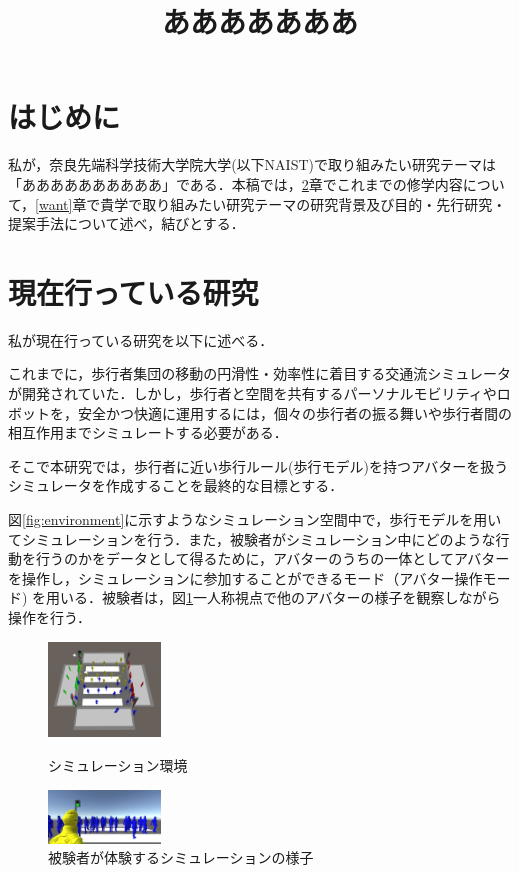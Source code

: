 \documentclass[twocolumn]{jarticle}%
\title{\vspace{5mm}\large{あああああああ}\vspace{-15mm}}
\date{}
\begin{document}
\normalsize
\maketitle

\section{はじめに}
\thispagestyle{fancy}

私が，奈良先端科学技術大学院大学(以下NAIST)で取り組みたい研究テーマは「ああああああああああ」である．本稿では，\ref{current}章でこれまでの修学内容について，\ref{want}章で貴学で取り組みたい研究テーマの研究背景及び目的・先行研究・提案手法について述べ，結びとする．

\section{現在行っている研究}\label{current}
私が現在行っている研究を以下に述べる．

これまでに，歩行者集団の移動の円滑性・効率性に着目する交通流シミュレータが開発されていた．しかし，歩行者と空間を共有するパーソナルモビリティやロボットを，安全かつ快適に運用するには，個々の歩行者の振る舞いや歩行者間の相互作用までシミュレートする必要がある．

そこで本研究では，歩行者に近い歩行ルール(歩行モデル)を持つアバターを扱うシミュレータを作成することを最終的な目標とする．

図\ref{fig:environment}に示すようなシミュレーション空間中で，歩行モデルを用いてシミュレーションを行う．また，被験者がシミュレーション中にどのような行動を行うのかをデータとして得るために，アバターのうちの一体としてアバターを操作し，シミュレーションに参加することができるモード（アバター操作モード) を用いる．被験者は，図\ref{fig:user_view}一人称視点で他のアバターの様子を観察しながら操作を行う．

\begin{figure}[htbp]
 \begin{minipage}{0.5\hsize}
  \begin{center}
   \includegraphics[width=30mm]{images/environment.JPG}
  \end{center}
  \caption{シミュレーション環境}
  \label{fig:environment}
 \end{minipage}
 \begin{minipage}{0.5\hsize}
  \begin{center}
   \includegraphics[width=30mm]{images/user_view.JPG}
  \end{center}
  \caption{被験者が体験するシミュレーションの様子}
  \label{fig:user_view}
 \end{minipage}
\end{figure}
\end{document}
